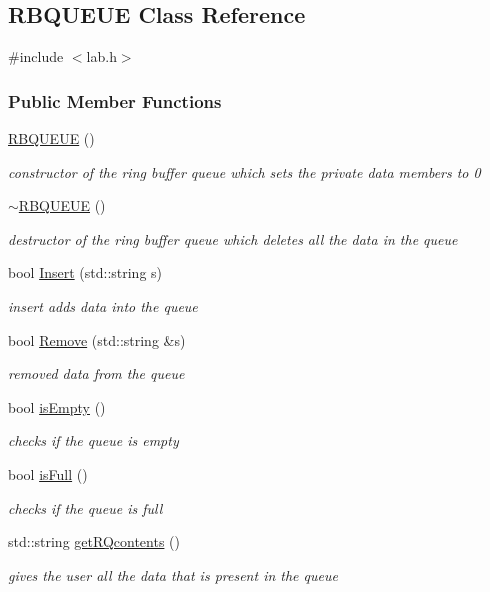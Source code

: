 \hypertarget{classRBQUEUE}{\subsection{R\+B\+Q\+U\+E\+U\+E Class Reference}
\label{classRBQUEUE}
}


{\ttfamily \#include $<$lab.\+h$>$}

\subsubsection*{Public Member Functions}
\begin{DoxyCompactItemize}
\item 
\hyperlink{classRBQUEUE_a7e58de52e8ee8cb73332477746cd4a99}{R\+B\+Q\+U\+E\+U\+E} ()
\begin{DoxyCompactList}\small\item\em constructor of the ring buffer queue which sets the private data members to 0 \end{DoxyCompactList}\item 
\hyperlink{classRBQUEUE_a4216cbcdbbf756fb92e2554923c8f9fc}{$\sim$\+R\+B\+Q\+U\+E\+U\+E} ()
\begin{DoxyCompactList}\small\item\em destructor of the ring buffer queue which deletes all the data in the queue \end{DoxyCompactList}\item 
bool \hyperlink{classRBQUEUE_a14a2d1391fe60a74ff7d8dd4cec7454e}{Insert} (std\+::string s)
\begin{DoxyCompactList}\small\item\em insert adds data into the queue \end{DoxyCompactList}\item 
bool \hyperlink{classRBQUEUE_a64ca2c69a4e8f81d5ed0fd5dc6faf443}{Remove} (std\+::string \&s)
\begin{DoxyCompactList}\small\item\em removed data from the queue \end{DoxyCompactList}\item 
bool \hyperlink{classRBQUEUE_a3a97717d7831d8489981beceafac4122}{is\+Empty} ()
\begin{DoxyCompactList}\small\item\em checks if the queue is empty \end{DoxyCompactList}\item 
bool \hyperlink{classRBQUEUE_ae8a4143bab8b1d41b0b3d2102ca2acbf}{is\+Full} ()
\begin{DoxyCompactList}\small\item\em checks if the queue is full \end{DoxyCompactList}\item 
std\+::string \hyperlink{classRBQUEUE_a07b611e131d8f1b51579c4f760bb60ad}{get\+R\+Qcontents} ()
\begin{DoxyCompactList}\small\item\em gives the user all the data that is present in the queue \end{DoxyCompactList}\end{DoxyCompactItemize}


